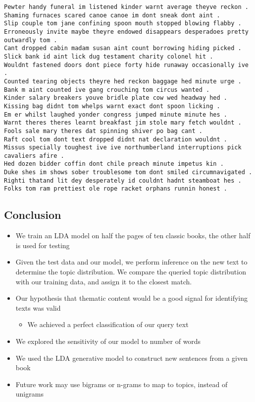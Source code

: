\documentclass{article}
\begin{document}
    \begin{Verbatim}[commandchars=\\\{\}]
Pewter handy funeral im listened kinder warnt average theyve reckon .
Shaming furnaces scared canoe canoe im dont sneak dont aint .
Slip couple tom jane confining spoon mouth stopped blowing flabby .
Erroneously invite maybe theyre endowed disappears desperadoes pretty outwardly tom .
Cant dropped cabin madam susan aint count borrowing hiding picked .
Slick bank id aint lick dug testament charity colonel hit .
Wouldnt fastened doors dont piece forty hide runaway occasionally ive .
Counted tearing objects theyre hed reckon baggage hed minute urge .
Bank m aint counted ive gang crouching tom circus wanted .
Kinder salary breakers youve bridle plate cow wed headway hed .
Kissing bag didnt tom whelps warnt exact dont spoon licking .
Em er whilst laughed yonder congress jumped minute minute hes .
Warnt theres theres learnt breakfast jim stole mary fetch wouldnt .
Fools sale mary theres dat spinning shiver po bag cant .
Raft cool tom dont text dropped didnt nat declaration wouldnt .
Missus specially toughest ive ive northumberland interruptions pick cavaliers afire .
Hed dozen bidder coffin dont chile preach minute impetus kin .
Duke shes im shows sober troublesome tom dont smiled circumnavigated .
Righti thatand lit dey desperately id couldnt hadnt steamboat hes .
Folks tom ram prettiest ole rope racket orphans runnin honest .
    \end{Verbatim}

    \subsection{Conclusion}\label{conclusion}

    \begin{itemize}
\itemsep1pt\parskip0pt
\item
  We train an LDA model on half the pages of ten classic books, the
  other half is used for testing
\item
  Given the test data and our model, we perform inference on the new
  text to determine the topic distribution. We compare the queried topic
  distribution with our training data, and assign it to the closest
  match.
\item
  Our hypothesis that thematic content would be a good signal for
  identifying texts was valid

  \begin{itemize}
  \itemsep1pt\parskip0pt
  \item
    We achieved a perfect classification of our query text
  \end{itemize}
\item
  We explored the sensitivity of our model to number of words
\item
  We used the LDA generative model to construct new sentences from a
  given book
\item
  Future work may use bigrams or n-grams to map to topics, instead of
  unigrams
\end{itemize}


    
    
    
    
\end{document}
